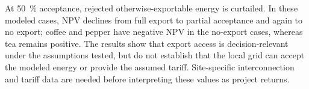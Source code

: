 At \qty{50}{\percent} acceptance, rejected otherwise-exportable energy is curtailed. In these modeled cases, NPV declines from full export to partial acceptance and again to no export; coffee and pepper have negative NPV in the no-export cases, whereas tea remains positive. The results show that export access is decision-relevant under the assumptions tested, but do not establish that the local grid can accept the modeled energy or provide the assumed tariff. Site-specific interconnection and tariff data are needed before interpreting these values as project returns.
